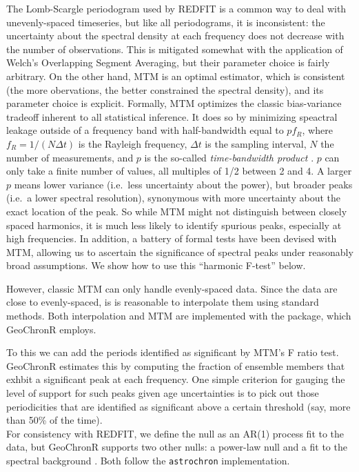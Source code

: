 \documentclass[gchron, manuscript]{copernicus}
\begin{document}
The Lomb-Scargle periodogram used by REDFIT is a common way to deal with unevenly-spaced timeseries, but like all periodograms, it is inconsistent: the uncertainty about the spectral density at each frequency does not decrease with the number of observations. This is mitigated somewhat with the application of Welch's Overlapping Segment Averaging, but their parameter choice is fairly arbitrary.
On the other hand, MTM \citep{thomson82} is an optimal estimator, which is consistent (the more obervations, the better constrained the spectral density), and its parameter choice is explicit. Formally, MTM optimizes the classic bias-variance tradeoff inherent to all statistical inference.
It does so by minimizing speactral leakage outside of a frequency band with half-bandwidth equal to \(pf_R\), where \(f_R=1/(N \Delta t)\) is the Rayleigh frequency, \(\Delta t\) is the sampling interval, \(N\) the number of measurements, and \(p\) is the so-called \emph{time-bandwidth product} \citep{Ghil02}.
\(p\) can only take a finite number of values, all multiples of 1/2 between 2 and 4.
A larger \(p\) means lower variance (i.e.~less uncertainty about the power), but broader peaks (i.e.~a lower spectral resolution), synonymous with more uncertainty about the exact location of the peak.
So while MTM might not distinguish between closely spaced harmonics, it is much less likely to identify spurious peaks, especially at high frequencies. In addition, a battery of formal tests have been devised with MTM, allowing us to ascertain the significance of spectral peaks under reasonably broad assumptions.
We show how to use this ``harmonic F-test'' below.

However, classic MTM can only handle evenly-spaced data.
Since the data are close to evenly-spaced, is is reasonable to interpolate them using standard methods.
Both interpolation and MTM are implemented with the \citep[astrochron][]{astrochron} package, which GeoChronR employs.

To this we can add the periods identified as significant by MTM's F ratio test. GeoChronR estimates this by computing the fraction of ensemble members that exhbit a significant peak at each frequency. One simple criterion for gauging the level of support for such peaks given age uncertainties is to pick out those periodicities that are identified as significant above a certain threshold (say, more than 50\% of the time).\\
For consistency with REDFIT, we define the null as an AR(1) process fit to the data, but GeoChronR supports two other nulls: a power-law null and a fit to the spectral background \citep{MannLees96}.
Both follow the \texttt{astrochron} implementation.
\end{document}
